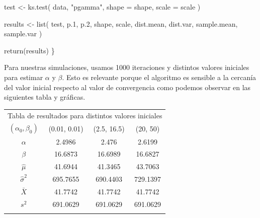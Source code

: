 \documentclass[9pt,twocolumn,twoside,]{pnas-new}
\newenvironment{Shaded}{}{}
\newcommand{\AttributeTok}[1]{\textcolor[rgb]{0.49,0.56,0.16}{#1}}
\newcommand{\FloatTok}[1]{\textcolor[rgb]{0.25,0.63,0.44}{#1}}
\newcommand{\FunctionTok}[1]{\textcolor[rgb]{0.02,0.16,0.49}{#1}}
\newcommand{\NormalTok}[1]{#1}
\newcommand{\OtherTok}[1]{\textcolor[rgb]{0.00,0.44,0.13}{#1}}
\newcommand{\StringTok}[1]{\textcolor[rgb]{0.25,0.44,0.63}{#1}}
\begin{document}
\begin{Shaded}
\begin{Highlighting}[]
\NormalTok{  test }\OtherTok{\textless{}{-}} \FunctionTok{ks.test}\NormalTok{(}
\NormalTok{          data, }\StringTok{"pgamma"}\NormalTok{,}
          \AttributeTok{shape =}\NormalTok{ shape, }\AttributeTok{scale =}\NormalTok{ scale}
\NormalTok{  )}

\NormalTok{  results }\OtherTok{\textless{}{-}} \FunctionTok{list}\NormalTok{(}
\NormalTok{          test,}
\NormalTok{          p}\FloatTok{.1}\NormalTok{, p}\FloatTok{.2}\NormalTok{,}
\NormalTok{          shape, scale,}
\NormalTok{          dist.mean, dist.var,}
\NormalTok{          sample.mean, sample.var}
\NormalTok{  )}

  \FunctionTok{return}\NormalTok{(results)}
\NormalTok{\}}
\end{Highlighting}
\end{Shaded}

Para nuestras simulaciones, usamos 1000 iteraciones y distintos valores
iniciales para estimar \(\alpha\) y \(\beta\). Esto es relevante porque
el algoritmo es sensible a la cercanía del valor inicial respecto al
valor de convergencia como podemos observar en las siguientes tabla y
gráficas.

\begin{table}[htbp]
\centering
\begin{tabular}{rrrr}
&       &       &  \\
\midrule
\midrule
\multicolumn{4}{c}{Tabla de resultados para distintos valores iniciales} \\
\multicolumn{1}{c}{$(\alpha_0, \beta_0)$} & \multicolumn{1}{c}{(0.01,  0.01)} & \multicolumn{1}{c}{(2.5, 16.5)} & \multicolumn{1}{c}{(20, 50)} \\
\midrule
\multicolumn{1}{c}{$\alpha$} & \multicolumn{1}{c}{2.4986} & \multicolumn{1}{c}{2.476} & \multicolumn{1}{c}{2.6199} \\
\multicolumn{1}{c}{$\beta$} & \multicolumn{1}{c}{16.6873} & \multicolumn{1}{c}{16.6989} & \multicolumn{1}{c}{16.6827} \\
\multicolumn{1}{c}{$\hat{\mu}$} & \multicolumn{1}{c}{41.6944} & \multicolumn{1}{c}{41.3465} & \multicolumn{1}{c}{43.7063} \\
\multicolumn{1}{c}{$\hat{\sigma}^2$} & \multicolumn{1}{c}{695.7655} & \multicolumn{1}{c}{690.4403} & \multicolumn{1}{c}{729.1397} \\
\multicolumn{1}{c}{$\bar{X}$} & \multicolumn{1}{c}{41.7742} & \multicolumn{1}{c}{41.7742} & \multicolumn{1}{c}{41.7742} \\
\multicolumn{1}{c}{$s^2$} & \multicolumn{1}{c}{691.0629} & \multicolumn{1}{c}{691.0629} & \multicolumn{1}{c}{691.0629} \\
\midrule
\midrule
&       &       &  \\
\end{tabular}%
\label{tab:addlabel}%
\end{table}
\end{document}
